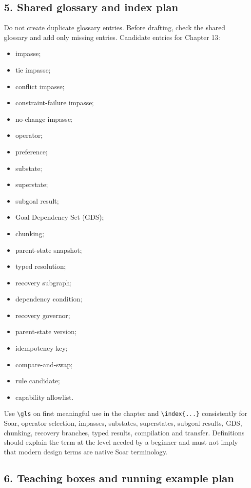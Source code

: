 \subsection{5. Shared glossary and index plan}\label{5-shared-glossary-and-index-plan}

Do not create duplicate glossary entries. Before drafting, check the shared glossary and add only missing entries. Candidate entries for Chapter 13:

\begin{itemize}
\tightlist
\item
  impasse;
\item
  tie impasse;
\item
  conflict impasse;
\item
  constraint-failure impasse;
\item
  no-change impasse;
\item
  operator;
\item
  preference;
\item
  substate;
\item
  superstate;
\item
  subgoal result;
\item
  Goal Dependency Set (GDS);
\item
  chunking;
\item
  parent-state snapshot;
\item
  typed resolution;
\item
  recovery subgraph;
\item
  dependency condition;
\item
  recovery governor;
\item
  parent-state version;
\item
  idempotency key;
\item
  compare-and-swap;
\item
  rule candidate;
\item
  capability allowlist.
\end{itemize}

Use \texttt{\textbackslash{}gls} on first meaningful use in the chapter and \texttt{\textbackslash{}index\{...\}} consistently for Soar, operator selection, impasses, substates, superstates, subgoal results, GDS, chunking, recovery branches, typed results, compilation and transfer. Definitions should explain the term at the level needed by a beginner and must not imply that modern design terms are native Soar terminology.

\subsection{6. Teaching boxes and running example plan}\label{6-teaching-boxes-and-running-example-plan}


